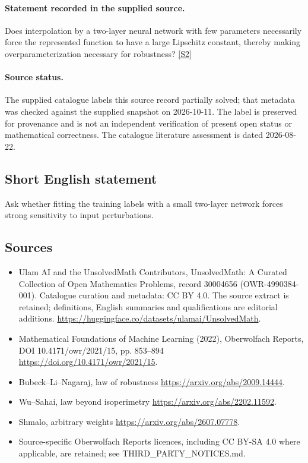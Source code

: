 \documentclass[11pt]{article}
\begin{document}
\paragraph{Statement recorded in the supplied source.}
Does interpolation by a two-layer neural network with few parameters necessarily force the represented function to have a large Lipschitz constant, thereby making overparameterization necessary for robustness? \href{https://doi.org/10.4171/owr/2021/15}{[S2]}
\paragraph{Source status.}
The supplied catalogue labels this source record partially solved; that metadata was checked against the supplied snapshot on 2026-10-11. The label is preserved for provenance and is not an independent verification of present open status or mathematical correctness. The catalogue literature assessment is dated 2026-08-22.
\subsection{Short English statement}
Ask whether fitting the training labels with a small two-layer network forces strong sensitivity to input perturbations.
\subsection{Sources}
\begin{itemize}
\item[S1] Ulam AI and the UnsolvedMath Contributors, UnsolvedMath: A Curated Collection of Open Mathematics Problems, record 30004656 (OWR-4990384-001). Catalogue curation and metadata: CC BY 4.0. The source extract is retained; definitions, English summaries and qualifications are editorial additions.
\url{https://huggingface.co/datasets/ulamai/UnsolvedMath}.
\item[S2] Mathematical Foundations of Machine Learning (2022), Oberwolfach Reports, DOI 10.4171/owr/2021/15, pp. 853--894
\url{https://doi.org/10.4171/owr/2021/15}.
\item[S3] Bubeck--Li--Nagaraj, law of robustness
\url{https://arxiv.org/abs/2009.14444}.
\item[S4] Wu--Sahai, law beyond isoperimetry
\url{https://arxiv.org/abs/2202.11592}.
\item[S5] Shmalo, arbitrary weights
\url{https://arxiv.org/abs/2607.07778}.
\item Source-specific Oberwolfach Reports licences, including CC BY-SA 4.0 where applicable, are retained; see THIRD\_PARTY\_NOTICES.md.
\end{itemize}
\end{document}
